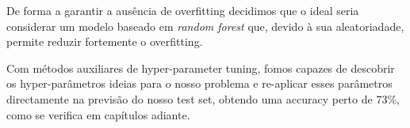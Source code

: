 De forma a garantir a ausência de overfitting decidimos que o ideal seria considerar um modelo baseado em \textit{random forest} que, devido à sua aleatoriadade, permite reduzir fortemente o overfitting.

Com métodos auxiliares de hyper-parameter tuning, fomos capazes de descobrir os hyper-parâmetros ideias para o nosso problema e re-aplicar esses parâmetros directamente na previsão do nosso test set, obtendo uma accuracy perto de 73\%, como se verifica em capítulos adiante. 